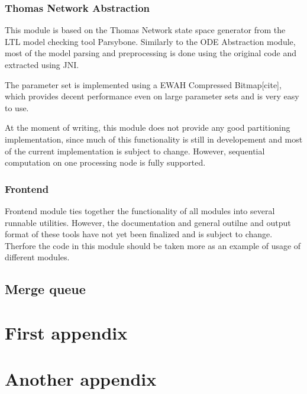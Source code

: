 \documentclass[12pt,oneside,draft]{fithesis2}
\begin{document}
			\subsection{Thomas Network Abstraction}

				This module is based on the Thomas Network state space generator from the LTL model checking tool Parsybone. Similarly to the ODE Abstraction module, most of the model parsing and preprocessing is done using the original code and extracted using JNI. 
				
				The parameter set is implemented using a EWAH Compressed Bitmap[cite], which provides decent performance even on large parameter sets and is very easy to use. 
				
				At the moment of writing, this module does not provide any good partitioning implementation, since much of this functionality is still in developement and most of the current implementation is subject to change. However, sequential computation on one processing node is fully supported.
				
			\subsection{Frontend}			
			
				Frontend module ties together the functionality of all modules into several runnable utilities. However, the documentation and general outilne and output format of these tools have not yet been finalized and is subject to change. Therfore the code in this module should be taken more as an example of usage of different modules.
				
		\section{Merge queue}
			
					
		
					
    \appendix
    \chapter{First appendix}        %
    \Blindtext
    \chapter{Another appendix}
    \Blindtext

      
	
\end{document}
